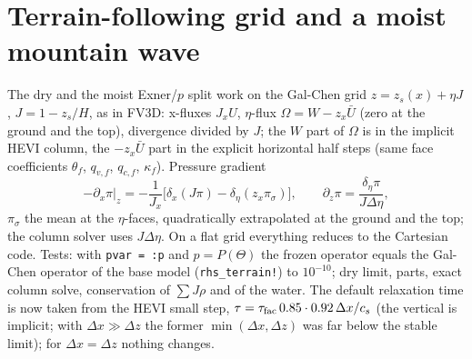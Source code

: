 \documentclass[11pt,a4paper]{article}
\newcommand{\code}[1]{\texttt{#1}}
\begin{document}
\section{Terrain-following grid and a moist mountain wave}\label{sec:hill}
The dry and the moist Exner/$p$ split work on the Gal-Chen grid $z=z_s(x)+\eta J$, $J=1-z_s/H$, as in
FV3D: x-fluxes $J_xU$, $\eta$-flux $\Omega=W-z_x\bar U$ (zero at the ground and the top), divergence
divided by $J$; the $W$ part of $\Omega$ is in the implicit HEVI column, the $-z_x\bar U$ part in the
explicit horizontal half steps (same face coefficients $\theta_f$, $q_{v,f}$, $q_{c,f}$, $\kappa_f$). Pressure
gradient
\[
-\partial_x\pi|_z=-\frac1{J_x}\Big[\delta_x(J\pi)-\delta_\eta(z_x\pi_\sigma)\Big],\qquad
\partial_z\pi=\frac{\delta_\eta\pi}{J\Delta\eta},
\]
$\pi_\sigma$ the mean at the $\eta$-faces, quadratically extrapolated at the ground and the top; the
column solver uses $J\Delta\eta$. On a flat grid everything reduces to the Cartesian code. Tests: with
\code{pvar = :p} and $p=P(\Theta)$ the frozen operator equals the Gal-Chen operator of the base model
(\code{rhs\_terrain!}) to $10^{-10}$; dry limit, parts, exact column solve, conservation of $\sum J\rho$ and
of the water. The default relaxation time is now taken from the HEVI small step,
$\tau=\tau_{\rm fac}\,0.85\cdot0.92\,\Delta x/c_s$ (the vertical is implicit; with $\Delta x\gg\Delta z$ the former
$\min(\Delta x,\Delta z)$ was far below the stable limit); for $\Delta x=\Delta z$ nothing changes.
\end{document}
